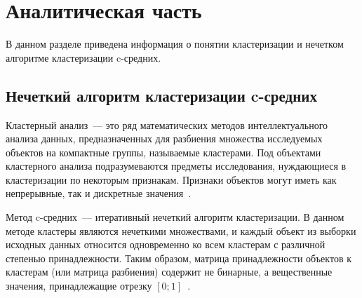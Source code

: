 \chapter{Аналитическая часть}

В данном разделе приведена информация о понятии кластеризации и нечетком алгоритме кластеризации c-средних.

\section{Нечеткий алгоритм кластеризации c-средних}

Кластерный анализ~--- это ряд математических методов интеллектуального анализа данных, предназначенных для разбиения множества исследуемых объектов на компактные группы, называемые кластерами. Под объектами кластерного анализа подразумеваются предметы исследования, нуждающиеся в кластеризации по некоторым признакам.
Признаки объектов могут иметь как непрерывные, так и дискретные значения~\cite{c-means}.

Метод c-средних~--- итеративный нечеткий алгоритм кластеризации.
В данном методе кластеры являются нечеткими множествами, и каждый объект из выборки исходных данных относится одновременно ко всем кластерам с различной степенью принадлежности.
Таким образом, матрица принадлежности объектов к кластерам (или матрица разбиения) содержит не бинарные, а вещественные значения, принадлежащие отрезку $[0; 1]$~\cite{c-means}.

